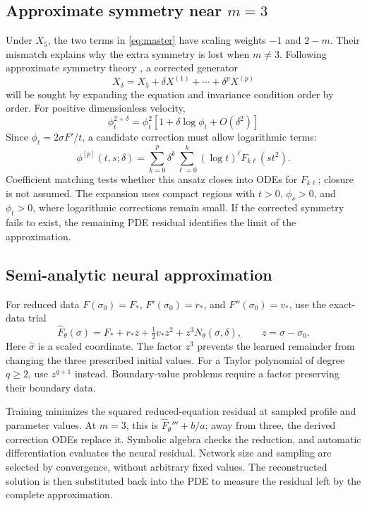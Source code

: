 \documentclass[12pt]{article}
\begin{document}
\subsection{Approximate symmetry near \texorpdfstring{$m=3$}{m=3}}

Under $X_5$, the two terms in \eqref{eq:master} have scaling weights $-1$ and $2-m$. Their mismatch explains why the extra symmetry is lost when $m\ne3$. Following approximate symmetry theory \cite{approx}, a corrected generator
\[
X_\delta=X_5+\delta X^{(1)}+\cdots+\delta^pX^{(p)}
\]
will be sought by expanding the equation and invariance condition order by order. For positive dimensionless velocity,
\[
\phi_t^{2+\delta}=\phi_t^2
\left[1+\delta\log\phi_t+O(\delta^2)\right]
\]
Since $\phi_t=2\sigma F'/t$, a candidate correction must allow logarithmic terms:
\[
\phi^{[p]}(t,s;\delta)=
\sum_{k=0}^p\delta^k\sum_{\ell=0}^k(\log t)^\ell F_{k\ell}(st^2).
\]
Coefficient matching tests whether this ansatz closes into ODEs for $F_{k\ell}$; closure is not assumed. The expansion uses compact regions with $t>0$, $\phi_s>0$, and $\phi_t>0$, where logarithmic corrections remain small. If the corrected symmetry fails to exist, the remaining PDE residual identifies the limit of the approximation.

\subsection{Semi-analytic neural approximation}

For reduced data $F(\sigma_0)=F_*$, $F'(\sigma_0)=r_*$, and $F''(\sigma_0)=v_*$, use the exact-data trial
\[
\widehat F_\theta(\sigma)=F_*+r_*z+\tfrac12v_*z^2+z^3N_\theta(\widehat\sigma,\delta),
\qquad z=\sigma-\sigma_0.
\]
Here $\widehat\sigma$ is a scaled coordinate. The factor $z^3$ prevents the learned remainder from changing the three prescribed initial values. For a Taylor polynomial of degree $q\ge2$, use $z^{q+1}$ instead. Boundary-value problems require a factor preserving their boundary data.

Training minimizes the squared reduced-equation residual at sampled profile and parameter values. At $m=3$, this is $\widehat F_\theta'''+b/a$; away from three, the derived correction ODEs replace it. Symbolic algebra checks the reduction, and automatic differentiation evaluates the neural residual. Network size and sampling are selected by convergence, without arbitrary fixed values. The reconstructed solution is then substituted back into the PDE to measure the residual left by the complete approximation.
\end{document}
